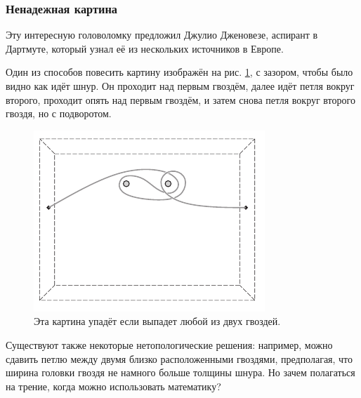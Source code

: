 \subsubsection*{Ненадежная картина}

Эту интересную головоломку предложил Джулио Дженовезе, аспирант в Дартмуте, который узнал её из нескольких источников в Европе.

Один из способов повесить картину изображён на рис. \ref{pic:kartina2}, с зазором, чтобы было видно как идёт шнур.
Он проходит над первым гвоздём, далее идёт петля вокруг второго,
проходит опять над первым гвоздём, и затем снова петля вокруг второго гвоздя, но с подворотом.

\begin{figure}[h!]
\centering
\includegraphics[scale=1]{pics/kartina2}
\caption{Эта картина упадёт если выпадет любой из двух гвоздей.}
\label{pic:kartina2}
\end{figure}

Существуют также некоторые нетопологические решения: например, можно сдавить петлю между двумя близко расположенными гвоздями, предполагая, что ширина головки гвоздя не намного больше толщины шнура.
Но зачем полагаться на трение, когда можно использовать математику?

